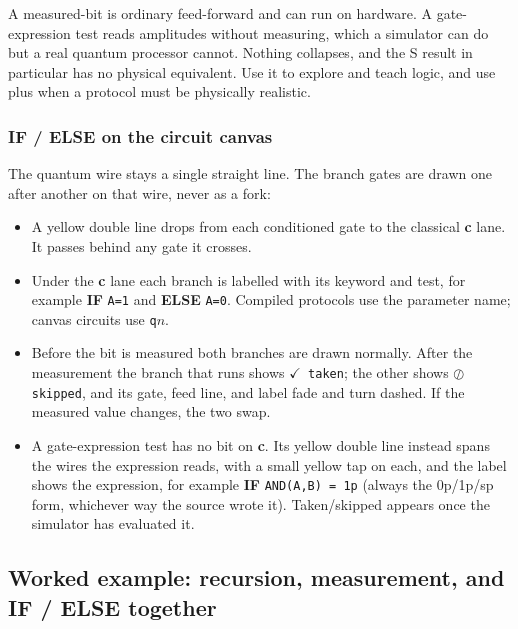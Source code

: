 \begin{cautionbox}
A measured-bit  is ordinary feed-forward and can run on
hardware. A gate-expression test reads amplitudes without measuring, which a
simulator can do but a real quantum processor cannot. Nothing collapses, and
the S result in particular has no physical equivalent. Use it to explore and
teach logic, and use  plus  when a protocol
must be physically realistic.
\end{cautionbox}

\subsubsection{IF / ELSE on the circuit canvas}

The quantum wire stays a single straight line. The branch gates are drawn one
after another on that wire, never as a fork:
\begin{itemize}
  \item A yellow double line drops from each conditioned gate to the
  classical \textbf{c} lane. It passes behind any gate it crosses.
  \item Under the \textbf{c} lane each branch is labelled with its keyword and
  test, for example \textbf{IF} \texttt{A=1} and \textbf{ELSE} \texttt{A=0}.
  Compiled protocols use the parameter name; canvas circuits use
  \texttt{q$n$}.
  \item Before the bit is measured both branches are drawn normally. After the
  measurement the branch that runs shows \texttt{$\checkmark$ taken}; the other shows
  \texttt{$\oslash$ skipped}, and its gate, feed line, and label fade and turn dashed.
  If the measured value changes, the two swap.
  \item A gate-expression test has no bit on \textbf{c}. Its yellow double
  line instead spans the wires the expression reads, with a small yellow tap on
  each, and the label shows the expression, for example \textbf{IF}
  \texttt{AND(A,B) = 1p} (always the 0p/1p/sp form, whichever way the source
  wrote it). Taken/skipped appears once the simulator has evaluated it.
\end{itemize}

\subsection{Worked example: recursion, measurement, and IF / ELSE together}

